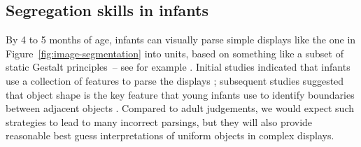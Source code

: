 %
%




\subsection{Segregation skills in infants}

\label{sect:infant-skills}


%
By 4 to 5 months of age, infants can
visually parse simple displays like the one in 
Figure~\ref{fig:image-segmentation}
 into units, based on something like 
a subset of static
Gestalt principles~--
 see for example .
%
%
%
Initial studies indicated that infants use a collection of
features to parse the displays \cite{needham98infants,needham97object,needham98effects}; subsequent studies suggested that object shape is the key
feature that young infants use to identify boundaries between adjacent
objects \cite{needham99role}.
%
%
Compared to adult judgements,
%
we would expect such strategies to lead to many incorrect parsings,
but they will
also provide reasonable best guess interpretations of uniform objects
in complex displays.  




